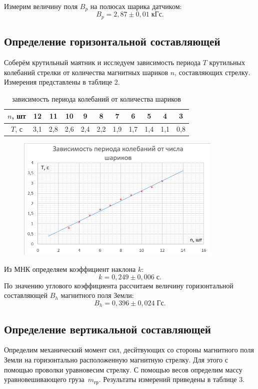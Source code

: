\documentclass[a4paper]{article}
\theoremstyle{definition}
\theoremstyle{remark}
\begin{document}
Измерим величину поля $B_p$ на полюсах шарика датчиком: $$B_p = 2,87 \pm 0,01 \;\text{кГс}.$$

\subsection{Определение горизонтальной составляющей}

Соберём крутильный маятник и исследуем зависимость периода $T$ крутильных колебаний стрелки от количества магнитных шариков $n$, составляющих стрелку. Измерения представлены в таблице 2.

\begin{table}[h!]
    \centering
    \begin{tabular}{|c|c|c|c|c|c|c|c|c|c|c|}
    \hline
    $n$, шт & 12  & 11  & 10  & 9   & 8   & 7   & 6   & 5   & 4   & 3   \\ \hline
    $T$, с  & 3,1 & 2,8 & 2,6 & 2,4 & 2,2 & 1,9 & 1,7 & 1,4 & 1,1 & 0,8 \\ \hline
    \end{tabular}
    \caption{зависимость периода колебаний от количества шариков}
    \end{table}


    \begin{figure}[t]
        \centering
        \includegraphics[width = 280pt]{image/graph1.png}
    \end{figure}


    Из МНК определяем коэффициент наклона $k$: $$k = 0,249 \pm 0,006 \; \text{с}.$$ По значению углового коэффициента рассчитаем величину горизонтальной составляющей $B_h$ магнитного поля Земли: $$B_h = 0,396 \pm  0,024\;\text{Гс}.$$


\subsection{Определение вертикальной составляющей}

Определим механический момент сил, десйтвующих со стороны магнитного поля Земли на горизонтально расположенную магнитную стрелку. Для этого с помощью проволки уравновесим стрелку. С помощью весов определим массу уравновешивающего груза~$m_{\text{гр}}$. Результаты измерений приведены в таблице 3.
\end{document}
